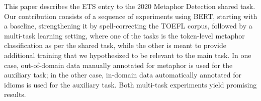 This paper describes the ETS entry to the 2020 Metaphor Detection shared task. Our contribution consists of a sequence of experiments using BERT, starting with a baseline, strengthening it by spell-correcting the TOEFL corpus, followed by a multi-task learning setting, where one of the tasks is the token-level metaphor classification as per the shared task, while the other is meant to provide additional training that we hypothesized to be relevant to the main task. In one case, out-of-domain data manually annotated for metaphor is used for the auxiliary task; in the other case, in-domain data automatically annotated for idioms is used for the auxiliary task. Both multi-task experiments yield promising results.
